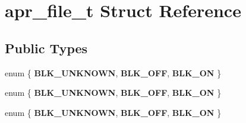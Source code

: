 \hypertarget{structapr__file__t}{}\section{apr\+\_\+file\+\_\+t Struct Reference}
\label{structapr__file__t}
\subsection*{Public Types}
\begin{DoxyCompactItemize}
\item 
\mbox{\label{structapr__file__t_a6b039184a6ba69d10e1377a744c2e521}} 
enum \{ {\bfseries B\+L\+K\+\_\+\+U\+N\+K\+N\+O\+WN}, 
{\bfseries B\+L\+K\+\_\+\+O\+FF}, 
{\bfseries B\+L\+K\+\_\+\+ON}
 \}
\item 
\mbox{\label{structapr__file__t_a7e1405e3676e46e8cf917c8b035e7f5b}} 
enum \{ {\bfseries B\+L\+K\+\_\+\+U\+N\+K\+N\+O\+WN}, 
{\bfseries B\+L\+K\+\_\+\+O\+FF}, 
{\bfseries B\+L\+K\+\_\+\+ON}
 \}
\item 
\mbox{\label{structapr__file__t_a4267a753ddaeafdff4e0b5b5d20a54a1}} 
enum \{ {\bfseries B\+L\+K\+\_\+\+U\+N\+K\+N\+O\+WN}, 
{\bfseries B\+L\+K\+\_\+\+O\+FF}, 
{\bfseries B\+L\+K\+\_\+\+ON}
 \}
\end{DoxyCompactItemize}

